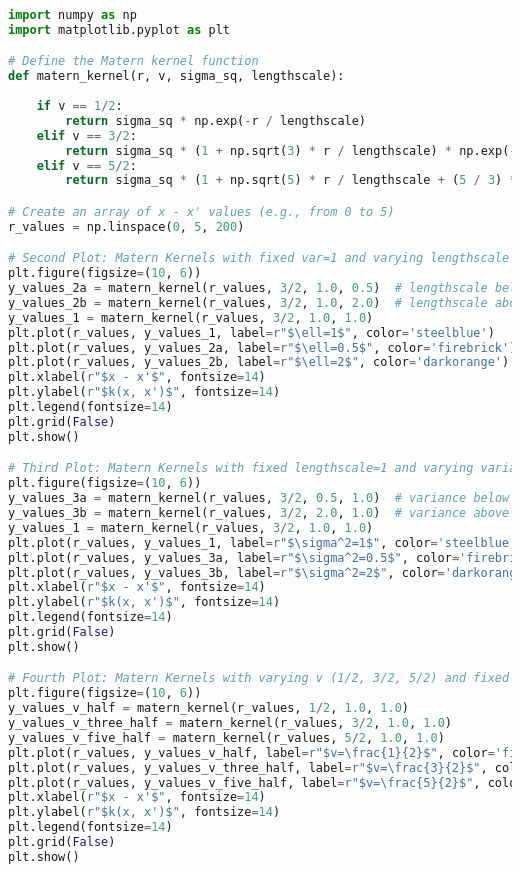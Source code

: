 \documentclass[12pt,a4paper]{article}
\begin{document}
\vspace{10pt}
\begin{lstlisting}[language=python, caption={Code of the Creation of Figures \ref{fig:Mat_PriorDist varying class plot},\ref{fig:Mat_PriorDist varying lengthscale plot} and \ref{fig:Mat_PriorDist varying scalefactor plot}}]
import numpy as np
import matplotlib.pyplot as plt

# Define the Matern kernel function
def matern_kernel(r, v, sigma_sq, lengthscale):
    
    if v == 1/2:
        return sigma_sq * np.exp(-r / lengthscale)
    elif v == 3/2:
        return sigma_sq * (1 + np.sqrt(3) * r / lengthscale) * np.exp(-np.sqrt(3) * r / lengthscale)
    elif v == 5/2:
        return sigma_sq * (1 + np.sqrt(5) * r / lengthscale + (5 / 3) * (r**2) / lengthscale**2) * np.exp(-np.sqrt(5) * r / lengthscale)

# Create an array of x - x' values (e.g., from 0 to 5)
r_values = np.linspace(0, 5, 200)

# Second Plot: Matern Kernels with fixed var=1 and varying lengthscale (below and above 1)
plt.figure(figsize=(10, 6))
y_values_2a = matern_kernel(r_values, 3/2, 1.0, 0.5)  # lengthscale below 1
y_values_2b = matern_kernel(r_values, 3/2, 1.0, 2.0)  # lengthscale above 1
y_values_1 = matern_kernel(r_values, 3/2, 1.0, 1.0)
plt.plot(r_values, y_values_1, label=r"$\ell=1$", color='steelblue')
plt.plot(r_values, y_values_2a, label=r"$\ell=0.5$", color='firebrick')
plt.plot(r_values, y_values_2b, label=r"$\ell=2$", color='darkorange')
plt.xlabel(r"$x - x'$", fontsize=14)
plt.ylabel(r"$k(x, x')$", fontsize=14)
plt.legend(fontsize=14)
plt.grid(False)
plt.show()

# Third Plot: Matern Kernels with fixed lengthscale=1 and varying variance (below and above 1)
plt.figure(figsize=(10, 6))
y_values_3a = matern_kernel(r_values, 3/2, 0.5, 1.0)  # variance below 1
y_values_3b = matern_kernel(r_values, 3/2, 2.0, 1.0)  # variance above 1
y_values_1 = matern_kernel(r_values, 3/2, 1.0, 1.0)
plt.plot(r_values, y_values_1, label=r"$\sigma^2=1$", color='steelblue')
plt.plot(r_values, y_values_3a, label=r"$\sigma^2=0.5$", color='firebrick')
plt.plot(r_values, y_values_3b, label=r"$\sigma^2=2$", color='darkorange')
plt.xlabel(r"$x - x'$", fontsize=14)
plt.ylabel(r"$k(x, x')$", fontsize=14)
plt.legend(fontsize=14)
plt.grid(False)
plt.show()

# Fourth Plot: Matern Kernels with varying v (1/2, 3/2, 5/2) and fixed lengthscale and variance
plt.figure(figsize=(10, 6))
y_values_v_half = matern_kernel(r_values, 1/2, 1.0, 1.0)
y_values_v_three_half = matern_kernel(r_values, 3/2, 1.0, 1.0)
y_values_v_five_half = matern_kernel(r_values, 5/2, 1.0, 1.0)
plt.plot(r_values, y_values_v_half, label=r"$v=\frac{1}{2}$", color='firebrick')
plt.plot(r_values, y_values_v_three_half, label=r"$v=\frac{3}{2}$", color='steelblue')
plt.plot(r_values, y_values_v_five_half, label=r"$v=\frac{5}{2}$", color='darkorange')
plt.xlabel(r"$x - x'$", fontsize=14)
plt.ylabel(r"$k(x, x')$", fontsize=14)
plt.legend(fontsize=14)
plt.grid(False)
plt.show()
\end{lstlisting}
\end{document}
